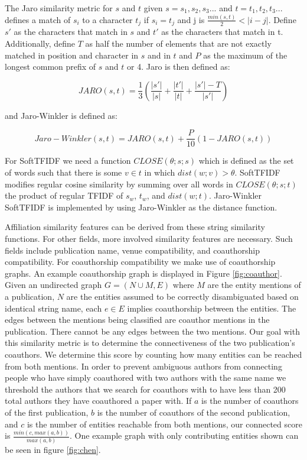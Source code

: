 \documentclass[twocolumn,letterpaper]{article}
\begin{document}
The Jaro similarity metric for $s$ and $t$ given $s= s_1,s_2,s_3...$ and $t= t_1,t_2,t_3...$ defines a match of $s_i$ to a character $t_j$ if $s_i=t_j$ and j is $\frac{min(s,t)}{2} < |i-j|$. Define $s'$ as the characters that match in $s$ and $t'$ as the characters that match in t. Additionally, define $T$ as half the number of elements that are not exactly matched in position and character in $s$ and in $t$ and $P$ as the maximum of the longest common prefix of $s$ and $t$ or 4. Jaro is then defined as:
\begin{center}
\[
	JARO(s,t) = \frac{1}{3}\left(\frac{|s'|}{|s|}+\frac{|t'|}{|t|}+\frac{|s'|-T}{|s'|}\right)
\]
\end{center}

and Jaro-Winkler is defined as:
\begin{center}
\[
	Jaro-Winkler(s,t) = JARO(s,t) + \frac{P}{10}(1-JARO(s,t))
\]
\end{center}

For SoftTFIDF we need a function $CLOSE(\theta; s; s)$ which is defined as the set of words such that there is some $v \in t$ in which $dist(w; v) > \theta$. SoftTFIDF modifies regular cosine similarity by summing over all words in $CLOSE(\theta; s; t)$ the product of regular TFIDF of $s_w$, $t_w$, and $dist(w;t)$. Jaro-Winkler SoftTFIDF is implemented by using Jaro-Winkler as the distance function.

Affiliation similarity features can be derived from these string similarity functions. For other fields, more involved similarity features are necessary. Such fields include publication name, venue compatibility, and coauthorship compatibility.  For coauthorship compatibility we make use of coauthorship graphs. An example coauthorship graph is displayed in Figure \ref{fig:coauthor}. Given an undirected graph $G=(N \cup M,E)$ where $M$ are the entity mentions of a publication, $N$ are the entities assumed to be correctly disambiguated based on identical string name, each $e \in E$ implies coauthorship between the entities. The edges between the mentions being classified are coauthor mentions in the publication. There cannot be any edges between the two mentions. Our goal with this similarity metric is to determine the connectiveness of the two publication's coauthors. We determine this score by counting how many entities can be reached from both mentions. In order to prevent ambiguous authors from connecting people who have simply coauthored with two authors with the same name we threshold the authors that we search for coauthors with to have less than 200 total authors they have coauthored a paper with. If $a$ is the number of coauthors of the first publication, $b$ is the number of coauthors of the second publication, and $c$ is the number of entities reachable from both mentions, our connected score is $\frac{min(c,max(a,b))}{max(a,b)}$. One example graph with only contributing entities shown can be seen in figure \ref{fig:chen}.
\end{document}
